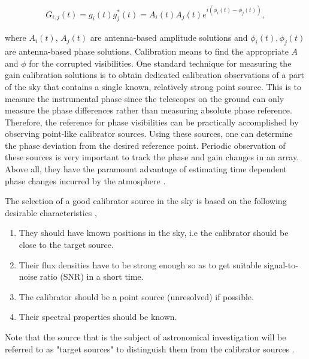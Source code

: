 \begin{align}
G_{i,j}(t)= g_i(t)g^*_j(t) = A_{i}(t)A_{j}(t) e ^{i\left(\phi_i(t)-\phi_j(t)\right)},
\label{Sols}
\end{align}

where  $A_{i}(t)$, $A_{j}(t)$ are antenna-based amplitude solutions and $\phi_i(t),\phi_j(t)$ are antenna-based phase solutions. Calibration means to find the appropriate $A$ and $\phi$ for the corrupted visibilities. One standard technique for measuring the gain calibration solutions is to obtain dedicated calibration observations of a part of the sky that contains a single known, relatively strong point source. This is to measure the instrumental phase since the telescopes on the ground can only measure the phase differences rather than measuring absolute phase reference. Therefore, the reference for phase visibilities can be practically accomplished by observing point-like calibrator sources. Using these sources, one can determine the phase deviation from the desired reference point. Periodic observation of these sources is very important  to track the phase and gain changes in an array. Above all, they have the paramount advantage of estimating time dependent phase changes incurred by the atmosphere \citep{taylor1999synthesis}.

The selection of a good calibrator source in the sky is based on the following desirable characteristics \citep{thompson2001interferometry}, 

\begin{enumerate}
\item They should have known positions in the sky, i.e the calibrator should be close to the target source. 
\item  Their flux densities have to be strong enough so as to get suitable signal-to-noise ratio (SNR) in a short time.
 \item The calibrator should be a point source (unresolved) if possible. 
 \item Their spectral properties should be known.
 \end{enumerate}
 
 Note that the source that is the subject of astronomical investigation will be referred to as "target sources" to distinguish them from the calibrator sources \citep{thompson2001interferometry}.
 
